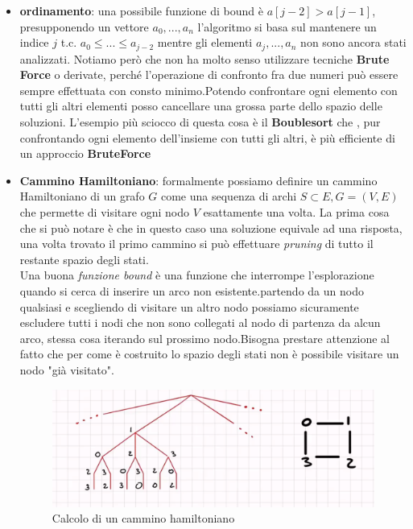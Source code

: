 \documentclass[a4paper]{article}
\begin{document}
\begin{itemize}
	\item \textbf{ordinamento}: una possibile funzione di bound è $a[j-2] > a[j-1]$, presupponendo un vettore $a_0, ... , a_n$ l'algoritmo si basa sul mantenere un indice $j$ t.c. $a_0 \leq ... \leq a_{j-2}$ mentre gli elementi $a_{j}, ..., a_{n}$ non sono ancora stati analizzati.
	Notiamo però che non ha molto senso utilizzare tecniche \textbf{Brute Force} o derivate, perché l'operazione di confronto fra due numeri può essere sempre effettuata con consto minimo.Potendo confrontare ogni elemento con tutti gli altri elementi posso cancellare una grossa parte dello spazio delle soluzioni.
	L'esempio più sciocco di questa cosa è il \textbf{Boublesort} che , pur confrontando ogni elemento dell'insieme con tutti gli altri, è più efficiente di un approccio \textbf{BruteForce}
	\item \textbf{Cammino Hamiltoniano}: formalmente possiamo definire un cammino Hamiltoniano di un grafo $G$ come una sequenza di archi $S \subset E, G= (V,E)$ che permette di visitare ogni nodo $V$ esattamente una volta.
	La prima cosa che si può notare è che in questo caso una soluzione equivale ad una risposta, una volta trovato il primo cammino si può effettuare \textit{pruning} di tutto il restante spazio degli stati.\\
	Una buona \textit{funzione bound} è una funzione che interrompe l'esplorazione quando si cerca di inserire un arco non esistente.partendo da un nodo qualsiasi e scegliendo di visitare un altro nodo possiamo sicuramente escludere tutti i nodi che non sono collegati al nodo di partenza da alcun arco, stessa cosa iterando sul prossimo nodo.Bisogna prestare attenzione al fatto che per come è costruito lo spazio degli stati non è possibile visitare un nodo "già visitato".
	\begin{figure}[!ht]
\centering
\includegraphics[width=1\textwidth]{./img/B2_hamiltoniano.png}
\caption{Calcolo di un cammino hamiltoniano} \label{FIG:B2_hamiltoniano}
\end{figure}\\

\end{itemize}
\end{document}
